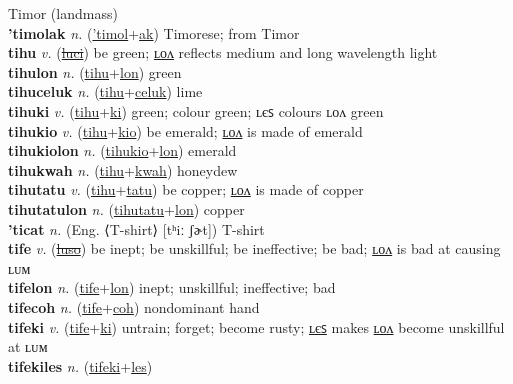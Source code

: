 Timor (landmass) \label{'timol} \\
\textbf{'timolak} \textit{n.} (\hyperref['timol]{'timol}+\hyperref[ak]{ak})
Timorese; from Timor \label{'timolak} \\
\textbf{tihu} \textit{v.} (\hyperref[luci]{\sout{luci}})
be green; \hyperref[tihulon]{ʟᴏᴧ} reflects medium and long wavelength light \label{tihu} \\
\textbf{tihulon} \textit{n.} (\hyperref[tihu]{tihu}+\hyperref[lon]{lon})
green \label{tihulon} \\
\textbf{tihuceluk} \textit{n.} (\hyperref[tihu]{tihu}+\hyperref[celuk]{celuk})
lime \label{tihuceluk} \\
\textbf{tihuki} \textit{v.} (\hyperref[tihu]{tihu}+\hyperref[ki]{ki})
green; colour green; ʟєꜱ colours ʟᴏᴧ green \label{tihuki} \\
\textbf{tihukio} \textit{v.} (\hyperref[tihu]{tihu}+\hyperref[kio]{kio})
be emerald; \hyperref[tihukiolon]{ʟᴏᴧ} is made of emerald \label{tihukio} \\
\textbf{tihukiolon} \textit{n.} (\hyperref[tihukio]{tihukio}+\hyperref[lon]{lon})
emerald \label{tihukiolon} \\
\textbf{tihukwah} \textit{n.} (\hyperref[tihu]{tihu}+\hyperref[kwah]{kwah})
honeydew \label{tihukwah} \\
\textbf{tihutatu} \textit{v.} (\hyperref[tihu]{tihu}+\hyperref[tatu]{tatu})
be copper; \hyperref[tihutatulon]{ʟᴏᴧ} is made of copper \label{tihutatu} \\
\textbf{tihutatulon} \textit{n.} (\hyperref[tihutatu]{tihutatu}+\hyperref[lon]{lon})
copper \label{tihutatulon} \\
\textbf{'ticat} \textit{n.} (Eng. ⟨T-shirt⟩ [tʰiː ʃɚt])
T-shirt \label{'ticat} \\
\textbf{tife} \textit{v.} (\hyperref[luso]{\sout{luso}})
be inept; be unskillful; be ineffective; be bad; \hyperref[tifelon]{ʟᴏᴧ} is bad at causing ʟᴜᴍ \label{tife} \\
\textbf{tifelon} \textit{n.} (\hyperref[tife]{tife}+\hyperref[lon]{lon})
inept; unskillful; ineffective; bad \label{tifelon} \\
\textbf{tifecoh} \textit{n.} (\hyperref[tife]{tife}+\hyperref[coh]{coh})
nondominant hand \label{tifecoh} \\
\textbf{tifeki} \textit{v.} (\hyperref[tife]{tife}+\hyperref[ki]{ki})
untrain; forget; become rusty; \hyperref[tifekiles]{ʟєꜱ} makes \hyperref[tifekilon]{ʟᴏᴧ} become unskillful at ʟᴜᴍ \label{tifeki} \\
\textbf{tifekiles} \textit{n.} (\hyperref[tifeki]{tifeki}+\hyperref[les]{les})
